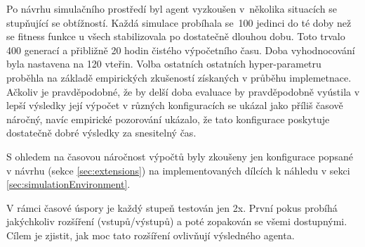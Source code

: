 Po návrhu simulačního prostředí byl agent vyzkoušen v~několika situacích se stupňující se obtížností. Každá simulace probíhala se~100 jedinci do té doby než se fitness funkce u všech stabilizovala po dostatečně dlouhou dobu. Toto trvalo 400 generací a přibližně 20 hodin čistého výpočetního času. Doba vyhodnocování byla nastavena na 120 vteřin. Volba ostatních ostatních hyper-parametru proběhla na základě empirických zkušeností získaných v průběhu implemetnace. 
Ačkoliv je pravděpodobné, že by delší doba evaluace by pravděpodobně vyústila v lepší výsledky její výpočet v různých konfiguracích se ukázal jako příliš časově náročný, navíc empirické pozorování ukázalo, že tato konfigurace poskytuje dostatečně dobré výsledky za snesitelný čas. 

S ohledem na časovou náročnost výpočtů byly zkoušeny jen konfigurace popsané v návrhu (sekce \ref{sec:extensions}) na implementovaných dílcích k náhledu v sekci \ref{sec:simulationEnvironment}.

V rámci časové úspory je každý stupeň testován jen 2x. První pokus probíhá jakýchkoliv rozšíření (vstupů/výstupů) a poté zopakován se všemi dostupnými. Cílem je zjistit, jak moc tato rozšíření ovlivňují výsledného agenta.

